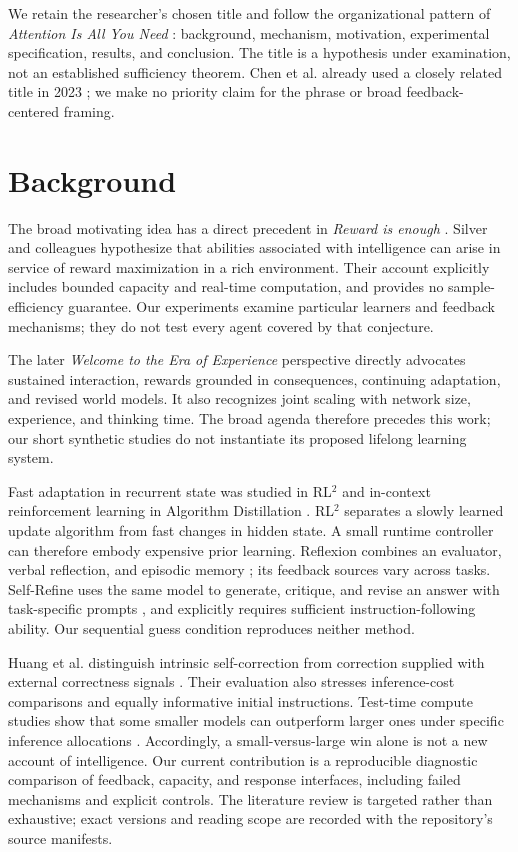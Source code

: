 \documentclass[11pt]{article}
\begin{document}
We retain the researcher's chosen title and follow the organizational pattern
of \emph{Attention Is All You Need} \cite{vaswani}: background, mechanism,
motivation, experimental specification, results, and conclusion. The title is
a hypothesis under examination, not an established sufficiency theorem.
Chen et al. already used a closely related title in 2023 \cite{chen}; we make
no priority claim for the phrase or broad feedback-centered framing.

\section{Background}
The broad motivating idea has a direct precedent in \emph{Reward is enough}
\cite{silver}. Silver and colleagues hypothesize that abilities associated with
intelligence can arise in service of reward maximization in a rich environment.
Their account explicitly includes bounded capacity and real-time computation,
and provides no sample-efficiency guarantee. Our experiments examine particular
learners and feedback mechanisms; they do not test every agent covered by that
conjecture.

The later \emph{Welcome to the Era of Experience} perspective \cite{experience}
directly advocates sustained interaction, rewards grounded in consequences,
continuing adaptation, and revised world models. It also recognizes joint
scaling with network size, experience, and thinking time. The broad agenda
therefore precedes this work; our short synthetic studies do not instantiate
its proposed lifelong learning system.

Fast adaptation in recurrent state was studied in RL$^2$ \cite{duan} and
in-context reinforcement learning in Algorithm Distillation \cite{laskin}.
RL$^2$ separates a slowly learned update algorithm from fast changes in hidden
state. A small runtime controller can therefore embody expensive prior learning.
Reflexion combines an evaluator, verbal reflection, and episodic memory
\cite{shinn}; its feedback sources vary across tasks. Self-Refine uses the same
model to generate, critique, and revise an answer with task-specific prompts
\cite{madaan}, and explicitly requires sufficient instruction-following ability.
Our sequential guess condition reproduces neither method.

Huang et al. distinguish intrinsic self-correction from correction supplied
with external correctness signals \cite{huang}. Their evaluation also stresses
inference-cost comparisons and equally informative initial instructions.
Test-time compute studies show that some smaller models can outperform larger
ones under specific inference allocations \cite{snell}. Accordingly, a
small-versus-large win alone is not a new account of intelligence. Our current
contribution is a reproducible diagnostic comparison of feedback, capacity,
and response interfaces, including failed mechanisms and explicit controls.
The literature review is targeted rather than exhaustive; exact versions and
reading scope are recorded with the repository's source manifests.
\end{document}
